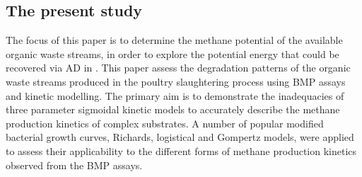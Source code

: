 \subsection{The present study}
The focus of this paper is to determine the methane potential of the available organic waste streams, in order to explore the potential energy that could be recovered via AD in . This paper assess the degradation patterns of the organic waste streams produced in the poultry slaughtering process using BMP assays and kinetic modelling. The primary aim is to demonstrate the inadequacies of three parameter sigmoidal kinetic models to accurately describe the methane production kinetics of complex substrates. A number of popular modified bacterial growth curves, Richards, logistical and Gompertz models, were applied to assess their applicability to the different forms of methane production kinetics observed from the BMP assays.